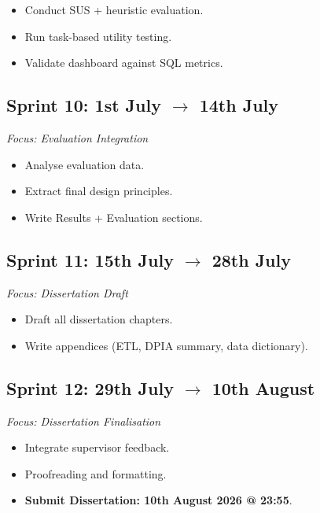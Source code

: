 \documentclass[12pt, a4paper, twoside]{article} %
\begin{document}
\begin{itemize}
  \item[$\square$] Conduct SUS + heuristic evaluation.
  \item[$\square$] Run task-based utility testing.
  \item[$\square$] Validate dashboard against SQL metrics.
\end{itemize}


\subsection{Sprint 10: 1st July $\rightarrow$ 14th July}
\emph{Focus: Evaluation Integration}

\begin{itemize}
  \item[$\square$] Analyse evaluation data.
  \item[$\square$] Extract final design principles.
  \item[$\square$] Write Results + Evaluation sections.
\end{itemize}


\subsection{Sprint 11: 15th July $\rightarrow$ 28th July}
\emph{Focus: Dissertation Draft}

\begin{itemize}
  \item[$\square$] Draft all dissertation chapters.
  \item[$\square$] Write appendices (ETL, DPIA summary, data dictionary).
\end{itemize}


\subsection{Sprint 12: 29th July $\rightarrow$ 10th August}
\emph{Focus: Dissertation Finalisation}

\begin{itemize}
  \item[$\square$] Integrate supervisor feedback.
  \item[$\square$] Proofreading and formatting.
  \item[$\square$] \textbf{Submit Dissertation: 10th August 2026 @ 23:55}.
\end{itemize}
\end{document}

